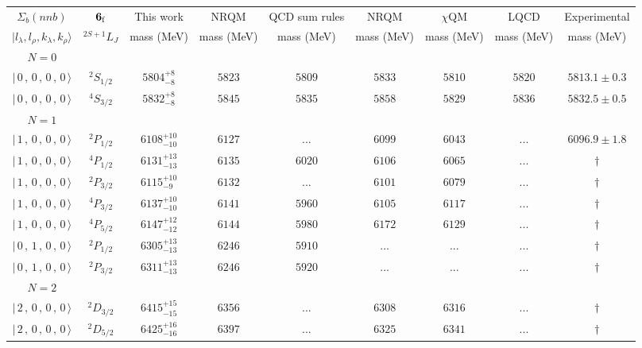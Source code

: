 \begin{tabular}{c c| c c c c c c c}\hline \hline
$\Sigma_{b}(nnb)$& ${\bf {6}}_{\rm f}$& This work   &   NRQM \cite{Yoshida2015}     &  QCD sum rules \cite{Liu2008, Mao2015, Chen2016}      &  NRQM \cite{Roberts2008}    & $\chi$QM \cite{Kim2021}        & LQCD \cite{Mohanta2020}     & Experimental  \\ 
 $\vert l_{\lambda}, l_{\rho}, k_{\lambda}, k_{\rho} \rangle$ & $^{2S+1}L_{J}$ & mass (MeV)  &   mass (MeV)  &  mass (MeV)  &  mass (MeV) & mass (MeV) & mass (MeV) &      mass (MeV) \\ \hline
\hline
 $N=0$  &  &  &  &  &  \\ 
$\vert \,0\,,\,0\,,\,0\,,\,0 \,\rangle $ & $^{2}S_{1/2}$ & $5804^{+8}_{-8}$ & $5823$ & $5809$ & $5833$ & $5810$ & $5820$ & $5813.1\pm 0.3$ \\ 
$\vert \,0\,,\,0\,,\,0\,,\,0 \,\rangle $ & $^{4}S_{3/2}$ & $5832^{+8}_{-8}$ & $5845$ & $5835$ & $5858$ & $5829$ & $5836$ & $5832.5\pm 0.5$ \\ 
\hline
 $N=1$  &  &  &  &  &  \\ 
$\vert \,1\,,\,0\,,\,0\,,\,0 \,\rangle $ & $^{2}P_{1/2}$ & $6108^{+10}_{-10}$ & $6127$ & ... & $6099$ & $6043$ & ... & $6096.9\pm 1.8$ \\ 
$\vert \,1\,,\,0\,,\,0\,,\,0 \,\rangle $ & $^{4}P_{1/2}$ & $6131^{+13}_{-13}$ & $6135$ & $6020$ & $6106$ & $6065$ & ... & $\dagger$ \\ 
$\vert \,1\,,\,0\,,\,0\,,\,0 \,\rangle $ & $^{2}P_{3/2}$ & $6115^{+10}_{-9}$ & $6132$ & ... & $6101$ & $6079$ & ... & $\dagger$ \\ 
$\vert \,1\,,\,0\,,\,0\,,\,0 \,\rangle $ & $^{4}P_{3/2}$ & $6137^{+10}_{-10}$ & $6141$ & $5960$ & $6105$ & $6117$ & ... & $\dagger$ \\ 
$\vert \,1\,,\,0\,,\,0\,,\,0 \,\rangle $ & $^{4}P_{5/2}$ & $6147^{+12}_{-12}$ & $6144$ & $5980$ & $6172$ & $6129$ & ... & $\dagger$ \\ 
$\vert \,0\,,\,1\,,\,0\,,\,0 \,\rangle $ & $^{2}P_{1/2}$ & $6305^{+13}_{-13}$ & $6246$ & $5910$ & ... & ... & ... & $\dagger$ \\ 
$\vert \,0\,,\,1\,,\,0\,,\,0 \,\rangle $ & $^{2}P_{3/2}$ & $6311^{+13}_{-13}$ & $6246$ & $5920$ & ... & ... & ... & $\dagger$ \\ 
\hline
 $N=2$  &  &  &  &  &  \\ 
$\vert \,2\,,\,0\,,\,0\,,\,0 \,\rangle $ & $^{2}D_{3/2}$ & $6415^{+15}_{-15}$ & $6356$ & ... & $6308$ & $6316$ & ... & $\dagger$ \\ 
$\vert \,2\,,\,0\,,\,0\,,\,0 \,\rangle $ & $^{2}D_{5/2}$ & $6425^{+16}_{-16}$ & $6397$ & ... & $6325$ & $6341$ & ... & $\dagger$ \\ 

\end{tabular}
